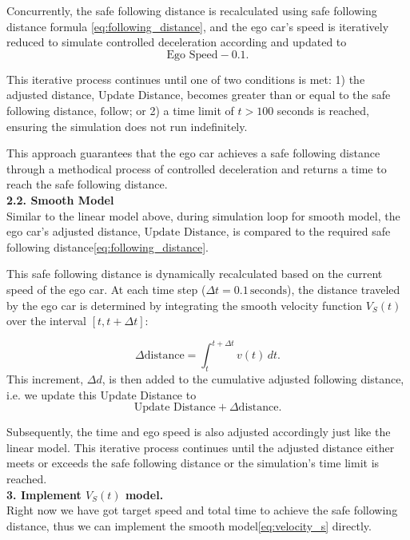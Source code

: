 \documentclass[12pt]{article}
\begin{document}
Concurrently, the safe following distance is recalculated using safe following distance formula \eqref{eq:following_distance}, and the ego car’s speed is iteratively reduced to simulate controlled deceleration according and updated to
\[
\text{Ego Speed} - 0.1.
\]

This iterative process continues until one of two conditions is met: 1) the adjusted distance, Update Distance, becomes greater than or equal to the safe following distance, \(\text{follow}\); or 2) a time limit of \(t > 100\) seconds is reached, ensuring the simulation does not run indefinitely.

This approach guarantees that the ego car achieves a safe following distance through a methodical process of controlled deceleration and returns a time to reach the safe following distance.\vspace{1 em} \\

\noindent \textbf{2.2. Smooth Model}\\
\indent Similar to the linear model above, during simulation loop for smooth model, the ego car's adjusted distance, \(\text{Update Distance}\), is compared to the required safe following distance\eqref{eq:following_distance}.

This safe following distance is dynamically recalculated based on the current speed of the ego car. At each time step (\(\Delta t = 0.1 \, \text{seconds}\)), the distance traveled by the ego car is determined by integrating the smooth velocity function \(V_S(t)\) over the interval \([t, t + \Delta t]\):

\[
\Delta \text{distance} = \int_t^{t+\Delta t} v(t) \, dt.
\]
This increment, \(\Delta d\), is then added to the cumulative adjusted following distance, i.e. we update this Update Distance
to
\[
\text{Update Distance} + \Delta \text{distance}.
\]

Subsequently, the time and ego speed is also adjusted accordingly just like the linear model. This iterative process continues until the adjusted distance either meets or exceeds the safe following distance or the simulation's time limit is reached.\vspace{1 em} \\

\setlength{\leftskip}{0em}
\noindent \textbf{3. Implement \(V_S(t)\) model.}\\

Right now we have got target speed and total time to achieve the safe following distance, thus we can implement the smooth model\eqref{eq:velocity_s} directly. 
\end{document}
